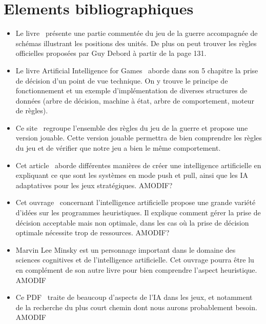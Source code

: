 \documentclass[12pt]{article}
\begin{document}
	\section{Elements bibliographiques}
	\begin{itemize}
		\item Le livre~\cite{ref1} présente une partie commentée du jeu de la guerre accompagnée de schémas illustrant les positions des unités. De plus on peut trouver les règles officielles proposées par Guy Debord à partir de la page 131.
		~~\\

		\item Le livre Artificial Intelligence for Games~\cite{ref2} aborde dans son 5 chapitre la prise de décision d'un point de vue technique. On y trouve le principe de fonctionnement et un exemple d'implémentation de diverses structures de données (arbre de décision, machine à état, arbre de comportement, moteur de règles).
		~~\\

		\item Ce site~\cite{ref4} regroupe l'ensemble des règles du jeu de la guerre et propose une version jouable. Cette version jouable permettra de bien comprendre les règles du jeu et de vérifier que notre jeu a bien le même comportement.
		~~\\

		\item Cet article~\cite{ref6} aborde différentes manières de créer une intelligence artificielle en expliquant ce que sont les systèmes en mode push et pull, ainsi que les IA adaptatives pour les jeux stratégiques. AMODIF?
		~~\\

		\item Cet ouvrage~\cite{ref7} concernant l'intelligence artificielle propose une grande variété d'idées sur les programmes heuristiques. Il explique comment gérer la prise de décision acceptable mais non optimale, dans les cas où la prise de décision optimale nécessite trop de ressources. AMODIF?
		~~\\

		\item Marvin Lee Minsky est un personnage important dans le domaine des sciences cognitives et de l'intelligence artificielle. Cet ouvrage pourra être lu en complément de son autre livre pour bien comprendre l'aspect heuristique. AMODIF
		~~\\

		\item Ce PDF~\cite{ref9} traite de beaucoup d'aspects de l'IA dans les jeux, et notamment de la recherche du plus court chemin dont nous aurons probablement besoin. AMODIF
		~~\\


\end{itemize}
\end{document}
